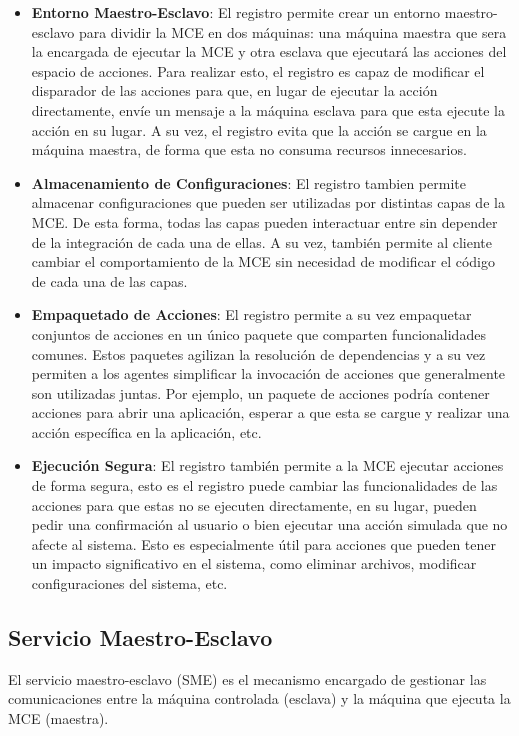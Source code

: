 \begin{itemize}
    \item \textbf{Entorno Maestro-Esclavo}: El registro permite crear un entorno maestro-esclavo para dividir la MCE en dos máquinas:
    una máquina maestra que sera la encargada de ejecutar la MCE y otra esclava que ejecutará las acciones del espacio de acciones. Para
    realizar esto, el registro es capaz de modificar el disparador de las acciones para que, en lugar de ejecutar la acción directamente, 
    envíe un mensaje a la máquina esclava para que esta ejecute la acción en su lugar. A su vez, el registro evita que la acción 
    se cargue en la máquina maestra, de forma que esta no consuma recursos innecesarios.

    \item \textbf{Almacenamiento de Configuraciones}: El registro tambien permite almacenar configuraciones que pueden ser utilizadas
    por distintas capas de la MCE. De esta forma, todas las capas pueden interactuar entre sin depender de la integración de cada una de ellas.
    A su vez, también permite al cliente cambiar el comportamiento de la MCE sin necesidad de modificar el código de cada una de las capas.

    \item \textbf{Empaquetado de Acciones}: El registro permite a su vez empaquetar conjuntos de acciones en un único paquete que comparten
    funcionalidades comunes. Estos paquetes agilizan la resolución de dependencias y a su vez permiten a los agentes simplificar la invocación 
    de acciones que generalmente son utilizadas juntas. Por ejemplo, un paquete de acciones podría contener acciones para abrir una 
    aplicación, esperar a que esta se cargue y realizar una acción específica en la aplicación, etc.

    \item \textbf{Ejecución Segura}: El registro también permite a la MCE ejecutar acciones de forma segura,
    esto es el registro puede cambiar las funcionalidades de las acciones para que estas
    no se ejecuten directamente, en su lugar, pueden pedir una confirmación al usuario o bien
    ejecutar una acción simulada que no afecte al sistema. Esto es especialmente
    útil para acciones que pueden tener un impacto significativo en el sistema, como
    eliminar archivos, modificar configuraciones del sistema, etc.

\end{itemize}

\subsection{Servicio Maestro-Esclavo}
El servicio maestro-esclavo (SME) es el mecanismo encargado de gestionar las comunicaciones
entre la máquina controlada (esclava) y la máquina que ejecuta la MCE (maestra). 

